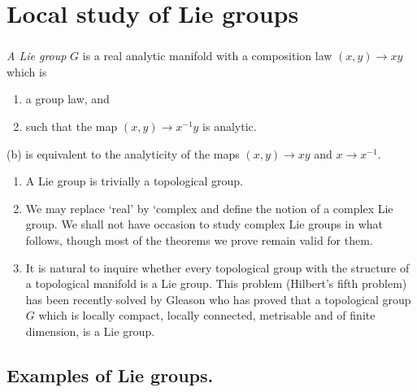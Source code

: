 
\chapter{Local study of Lie groups}\label{chap2}

\setcounter{section}{2}
\setcounter{subsection}{0}
\subsection{}\pageoriginale\label{chap2-sec2.1}%

\begin{defi*}
{\em A Lie group} $G$ is a real analytic manifold with a composition
law $(x,y)\to xy$ which is  
\begin{enumerate}
\renewcommand{\theenumi}{\alph{enumi}}
\renewcommand{\labelenumi}{\rm(\theenumi)}
\item  a group law, and
\item such that the map $(x,y)\to x^{-1}y$ is analytic.
\end{enumerate}

(b) is equivalent to the analyticity of the maps $(x,y) \to xy$ and $x
\rightarrow x^{-1}$. 
\end{defi*}

\begin{remarks*}
\begin{enumerate}
\renewcommand{\labelenumi}{(\theenumi)}
\item  A Lie group is trivially a topological group.

\item  We may replace `real' by `complex and define the notion of a
  complex Lie group. We shall not have occasion to study complex Lie
  groups in what follows, though most of the theorems we prove remain
  valid for them. 

\item  It is natural to inquire whether every topological group with
  the structure of a topological manifold is a Lie group. This problem
  (Hilbert's fifth problem) has been recently solved by Gleason
  \cite{key18} who has proved that a topological group $G$ which is
  locally compact, locally connected, metrisable and of finite
  dimension, is a Lie group. 
\end{enumerate}
\end{remarks*}

\section*{Examples of Lie groups.}

